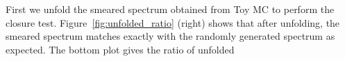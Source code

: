 First we unfold the smeared spectrum obtained from Toy MC to perform the closure test. Figure~\ref{fig:unfolded_ratio} (right) shows 
that after unfolding, the smeared spectrum matches exactly with the randomly generated spectrum as expected. The bottom plot gives the ratio of unfolded 
